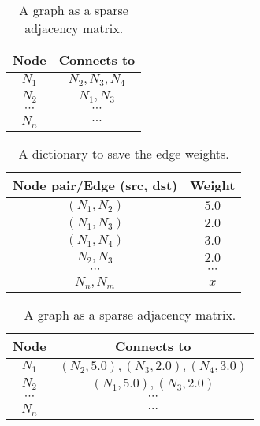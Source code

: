 \begin{center}
  \begin{table}
    \begin{tabular}{c|c}
      Node & Connects to\\
      \hline
      $N_1$ & $N_2, N_3, N_4$\\
      $N_2$ & $N_1, N_3$\\
      $\cdots$ & $\cdots$\\
      $N_n$ & $\cdots$
    \end{tabular}
    \caption{A graph as a sparse adjacency matrix.}
    \label{table:sparse_matrix_1}
  \end{table}
\end{center}

\begin{center}
  \begin{table}
    \begin{tabular}{c|c}
      Node pair/Edge (src, dst) & Weight\\
      \hline
      $(N_1, N_2)$ & $5.0$\\
      $(N_1, N_3)$ & $2.0$\\
      $(N_1, N_4)$ & $3.0$\\
      $N_2, N_3$ & $2.0$\\
      $\cdots$ & $\cdots$\\
      $N_n, N_m$ & $x$
    \end{tabular}
    \caption{A dictionary to save the edge weights.}
    \label{table:sparse_matrix_weights}
  \end{table}
\end{center}

\begin{center}
  \begin{table}
    \begin{tabular}{c|c}
      Node & Connects to\\
      \hline
      $N_1$ & $(N_2, 5.0), (N_3, 2.0), (N_4, 3.0)$\\
      $N_2$ & $(N_1, 5.0), (N_3, 2.0)$\\
      $\cdots$ & $\cdots$\\
      $N_n$ & $\cdots$
    \end{tabular}
    \caption{A graph as a sparse adjacency matrix.}
    \label{table:sparse_matrix_2}
  \end{table}
\end{center}
